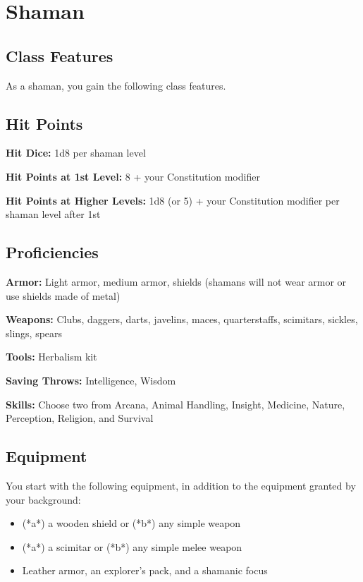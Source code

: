 \section{Shaman}

\subsection{Class Features}

As a shaman, you gain the following class features.

\subsection{Hit Points}

\textbf{Hit Dice:} 1d8 per shaman level

\textbf{Hit Points at 1st Level:} 8 + your Constitution modifier

\textbf{Hit Points at Higher Levels:} 1d8 (or 5) + your Constitution modifier per shaman level after 1st

\subsection{Proficiencies}

\textbf{Armor:} Light armor, medium armor, shields (shamans will not wear armor or use shields made of metal)

\textbf{Weapons:} Clubs, daggers, darts, javelins, maces, quarterstaffs, scimitars, sickles, slings, spears

\textbf{Tools:} Herbalism kit

\textbf{Saving Throws:} Intelligence, Wisdom

\textbf{Skills:} Choose two from Arcana, Animal Handling, Insight, Medicine, Nature, Perception, Religion, and Survival

\subsection{Equipment}

You start with the following equipment, in addition to the equipment granted by your background:
\begin{itemize}
\item (*a*) a wooden shield or (*b*) any simple weapon
\item (*a*) a scimitar or (*b*) any simple melee weapon
\item Leather armor, an explorer's pack, and a shamanic focus
\end{itemize}

